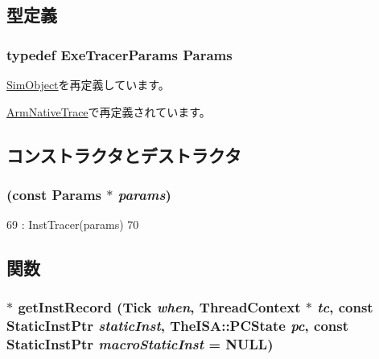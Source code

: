 \subsection{型定義}
\hypertarget{classTrace_1_1ExeTracer_a6680098765037131737b022c9fa9252e}{
\subsubsection[{Params}]{\setlength{\rightskip}{0pt plus 5cm}typedef ExeTracerParams {\bf Params}}}
\label{classTrace_1_1ExeTracer_a6680098765037131737b022c9fa9252e}


\hyperlink{classSimObject_a0f0761d2db586a23bb2a2880b8f387bb}{SimObject}を再定義しています。

\hyperlink{classTrace_1_1ArmNativeTrace_a7c28c46dd6590e680f44a6066c34caf5}{ArmNativeTrace}で再定義されています。

\subsection{コンストラクタとデストラクタ}
\hypertarget{classTrace_1_1ExeTracer_a92497a46d4e8c8ca276bf6c6aecf54a8}{
\subsubsection[{ExeTracer}]{ (const {\bf Params} $\ast$ {\em params})}}
\label{classTrace_1_1ExeTracer_a92497a46d4e8c8ca276bf6c6aecf54a8}



\begin{DoxyCode}
69                                     : InstTracer(params)
70     {}
\end{DoxyCode}


\subsection{関数}
\hypertarget{classTrace_1_1ExeTracer_a89ee504d255c652e5d54b73319d4d3dc}{
\subsubsection[{getInstRecord}]{$\ast$ getInstRecord ({\bf Tick} {\em when}, \/  {\bf ThreadContext} $\ast$ {\em tc}, \/  const {\bf StaticInstPtr} {\em staticInst}, \/  TheISA::PCState {\em pc}, \/  const {\bf StaticInstPtr} {\em macroStaticInst} = {\ttfamily NULL})}}
\label{classTrace_1_1ExeTracer_a89ee504d255c652e5d54b73319d4d3dc}


